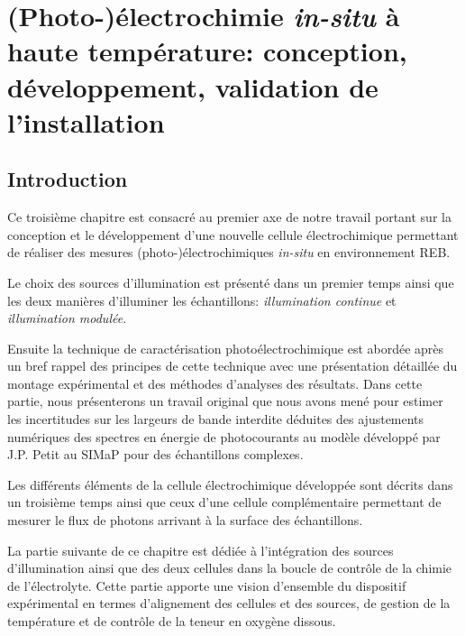 

\chapter{(Photo-)électrochimie \emph{in-situ} à haute température: conception, développement, validation de l'installation}
\label{chap:design}
\begin{refsection}
\minitoc

\section{Introduction}
    Ce troisième chapitre est consacré au premier axe de notre travail portant sur la conception et le développement
    d'une nouvelle cellule électrochimique permettant de réaliser des mesures (photo-)électrochimiques \emph{in-situ} en 
    environnement REB.

    Le choix des sources d'illumination est présenté dans un premier temps ainsi que les deux manières d'illuminer
    les échantillons: \emph{illumination continue} et \emph{illumination modulée}.
    
    Ensuite la technique de caractérisation
    photoélectrochimique est abordée après un bref rappel des principes de cette technique avec une présentation
    détaillée du montage expérimental et des méthodes d'analyses des résultats. Dans cette partie, nous présenterons un
    travail original que nous avons mené pour estimer les incertitudes sur les largeurs de bande interdite déduites des
    ajustements numériques des spectres en énergie de photocourants au modèle développé par J.P. Petit \citep{Petit2013} au SIMaP pour des
    échantillons complexes.
    
    Les différents éléments de la cellule électrochimique développée sont décrits dans un troisième temps 
    ainsi que ceux d'une cellule complémentaire permettant de mesurer le flux de photons arrivant à la surface des
    échantillons.

    La partie suivante de ce chapitre est dédiée à l'intégration des sources d'illumination ainsi que des deux cellules
    dans la boucle de contrôle de la chimie de l'électrolyte. Cette partie apporte une vision d'ensemble
    du dispositif expérimental en
    termes d'alignement des cellules et des sources, de gestion de la température et de contrôle de la teneur en
    oxygène dissous. 



\end{refsection}
